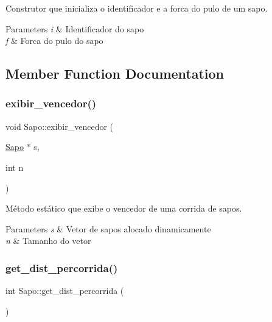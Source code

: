 Construtor que inicializa o identificador e a forca do pulo de um sapo. 


\begin{DoxyParams}{Parameters}
{\em i} & Identificador do sapo \\
\hline
{\em f} & Forca do pulo do sapo \\
\hline
\end{DoxyParams}


\subsection{Member Function Documentation}
\mbox{\label{classSapo_a9a223c19115eee492036e71f796ce6d2}} 
\subsubsection{\texorpdfstring{exibir\+\_\+vencedor()}{exibir\_vencedor()}}
{\footnotesize\ttfamily void Sapo\+::exibir\+\_\+vencedor (\begin{DoxyParamCaption}\item[{\hyperlink{classSapo}{Sapo} $\ast$}]{s,  }\item[{int}]{n }\end{DoxyParamCaption})\hspace{0.3cm}{\ttfamily [static]}}



Método estático que exibe o vencedor de uma corrida de sapos. 


\begin{DoxyParams}{Parameters}
{\em s} & Vetor de sapos alocado dinamicamente \\
\hline
{\em n} & Tamanho do vetor \\
\hline
\end{DoxyParams}
\mbox{\label{classSapo_a5256452b7012da02582d47d19bfb80f9}} 
\subsubsection{\texorpdfstring{get\+\_\+dist\+\_\+percorrida()}{get\_dist\_percorrida()}}
{\footnotesize\ttfamily int Sapo\+::get\+\_\+dist\+\_\+percorrida (\begin{DoxyParamCaption}{ }\end{DoxyParamCaption})}



